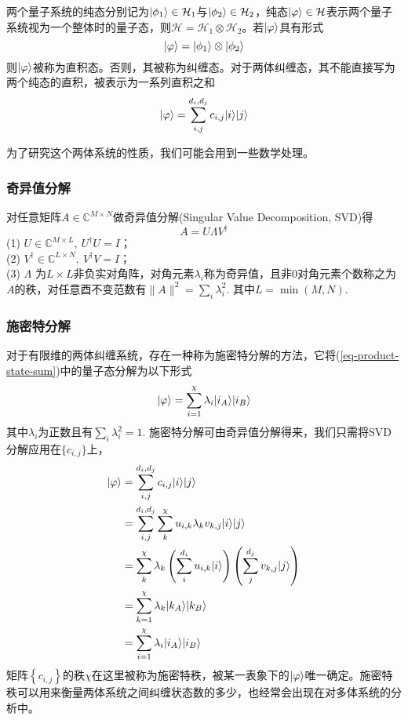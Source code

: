 两个量子系统的纯态分别记为$\lvert\phi_1\rangle\in\mathcal{H}_1$与$\lvert\phi_2\rangle\in\mathcal{H}_2$，纯态$\lvert\varphi\rangle\in\mathcal{H}$表示两个量子系统视为一个整体时的量子态，则$\mathcal{H} = \mathcal{H}_1\otimes\mathcal{H}_2$。若$\lvert\varphi\rangle$具有形式
\begin{equation}\label{eq-product-state}
\lvert\varphi\rangle=\lvert\phi_1\rangle\otimes\lvert\phi_2\rangle
\end{equation}
则$\lvert\varphi\rangle$被称为直积态。否则，其被称为纠缠态。对于两体纠缠态，其不能直接写为两个纯态的直积，被表示为一系列直积之和
\begin{equation}\label{eq-product-state-sum}
\lvert\varphi\rangle = \sum_{i,j}^{d_i,d_j} c_{i,j}\lvert i\rangle\lvert j\rangle
\end{equation}

为了研究这个两体系统的性质，我们可能会用到一些数学处理。

\subsubsection{奇异值分解}

对任意矩阵$A\in\mathbb{C}^{M\times N}$做奇异值分解\cite{stewartEarlyHistorySingular1993}(Singular Value Decomposition, SVD)得
\begin{equation}\label{eq-SVD}
A = U \Lambda V^\dagger
\end{equation}
(1) $U\in\mathbb{C}^{M\times L},\: U^\dagger U=I$；\\(2) $V^\dagger\in\mathbb{C}^{L\times N},\: V^\dagger V=I$；\\(3) $\Lambda$ 为$L\times L$非负实对角阵，对角元素$\lambda_i$称为奇异值，且非$0$对角元素个数称之为$A$的秩，对任意酉不变范数有$\lVert A \rVert^2=\sum_i \lambda_i^2$. 其中$L=\min(M,N)$.

\subsubsection{施密特分解}

对于有限维的两体纠缠系统，存在一种称为施密特分解的方法，它将(\ref{eq-product-state-sum})中的量子态分解为以下形式
\begin{equation}\label{eq-sd-phi}
\lvert\varphi\rangle=\sum_{i=1}^{\chi} \lambda_i \lvert i_A\rangle\lvert i_B\rangle
\end{equation}
其中$\lambda_i$为正数且有$\sum_i \lambda_i^2 = 1$. 施密特分解可由奇异值分解得来，我们只需将SVD分解应用在$\{c_{i,j}\}$上，
\begin{align}
	\lvert\varphi\rangle &= \sum_{i,j}^{d_i,d_j} c_{i,j}\lvert i\rangle\lvert j\rangle \\
		 &= \sum_{i,j}^{d_i,d_j} \sum_k^\chi u_{i,k} \lambda_{k} v_{k,j} \lvert i\rangle\lvert j\rangle\\
		 &= \sum_k^\chi \lambda_k \left( \sum_i^{d_i}u_{i,k}\lvert i\rangle \right) \left( \sum_j^{d_j}v_{k,j}\lvert j\rangle \right)\\
		 &= \sum_{k=1}^{\chi} \lambda_k \lvert k_A\rangle\lvert k_B\rangle\\
		 &= \sum_{i=1}^{\chi} \lambda_i \lvert i_A\rangle\lvert i_B\rangle
\end{align}
矩阵$\left\{c_{i,j}\right\}$的秩$\chi$在这里被称为施密特秩，被某一表象下的$\lvert\varphi\rangle$唯一确定。施密特秩可以用来衡量两体系统之间纠缠状态数的多少，也经常会出现在对多体系统的分析中。

